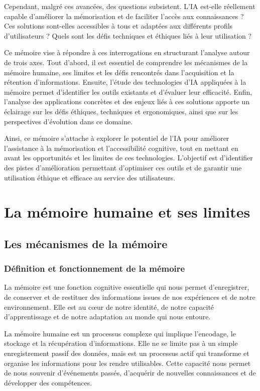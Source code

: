 \documentclass[12pt,a4paper]{report}
\begin{document}
Cependant, malgré ces avancées, des questions subsistent. L'IA est-elle réellement capable d'améliorer la mémorisation et de faciliter l'accès aux connaissances ? Ces solutions sont-elles accessibles à tous et adaptées aux différents profils d'utilisateurs ? Quels sont les défis techniques et éthiques liés à leur utilisation ?

\newpage
Ce mémoire vise à répondre à ces interrogations en structurant l'analyse autour de trois axes. Tout d'abord, il est essentiel de comprendre les mécanismes de la mémoire humaine, ses limites et les défis rencontrés dans l'acquisition et la rétention d'informations. Ensuite, l'étude des technologies d'IA appliquées à la mémoire permet d'identifier les outils existants et d'évaluer leur efficacité. Enfin, l'analyse des applications concrètes et des enjeux liés à ces solutions apporte un éclairage sur les défis éthiques, techniques et ergonomiques, ainsi que sur les perspectives d'évolution dans ce domaine.

Ainsi, ce mémoire s'attache à explorer le potentiel de l'IA pour améliorer l'assistance à la mémorisation et l'accessibilité cognitive, tout en mettant en avant les opportunités et les limites de ces technologies. L'objectif est d'identifier des pistes d'amélioration permettant d'optimiser ces outils et de garantir une utilisation éthique et efficace au service des utilisateurs.

\chapter{La mémoire humaine et ses limites}

\section{Les mécanismes de la mémoire}

\subsection{Définition et fonctionnement de la mémoire}

La mémoire est une fonction cognitive essentielle qui nous permet d'enregistrer, de conserver et de restituer des informations issues de nos expériences et de notre environnement. Elle est au cœur de notre identité, de notre capacité d'apprentissage et de notre adaptation au monde qui nous entoure.

La mémoire humaine est un processus complexe qui implique l'encodage, le stockage et la récupération d'informations. Elle ne se limite pas à un simple enregistrement passif des données, mais est un processus actif qui transforme et organise les informations pour les rendre utilisables. Cette capacité nous permet de nous souvenir d'événements passés, d'acquérir de nouvelles connaissances et de développer des compétences.
\cite{mnpaf}
\end{document}
